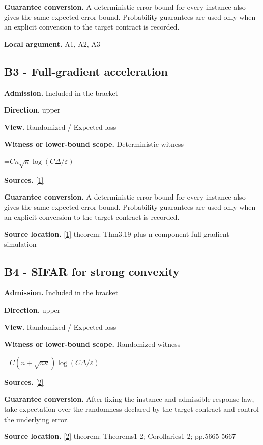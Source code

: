 \documentclass[10pt,a4paper]{article}
\newcommand{\AtlasMath}[1]{\par\begingroup\centering\setbox0=\hbox{$\displaystyle #1$}\ifdim\wd0>1.4\linewidth\typeout{ATLAS WIDE FORMULA: \the\wd0}\fi\ifdim\wd0>\linewidth\resizebox{\linewidth}{!}{\box0}\else\box0\fi\par\endgroup}
\begin{document}
\textbf{Guarantee conversion.} A deterministic error bound for every instance also gives the same expected-error bound. Probability guarantees are used only when an explicit conversion to the target contract is recorded.

\textbf{Local argument.} A1, A2, A3

\subsection{B3 - Full-gradient acceleration}
\textbf{Admission.} Included in the bracket

\textbf{Direction.} upper

\textbf{View.} Randomized / Expected loss

\textbf{Witness or lower-bound scope.} Deterministic witness

\AtlasMath{Cn\sqrt\kappa\log(C\Delta/\varepsilon)}
\textbf{Sources.} \href{https://arxiv.org/pdf/1405.4980}{[1]}

\textbf{Guarantee conversion.} A deterministic error bound for every instance also gives the same expected-error bound. Probability guarantees are used only when an explicit conversion to the target contract is recorded.

\textbf{Source location.} \href{https://arxiv.org/pdf/1405.4980}{[1]} theorem: Thm3.19 plus n component full-gradient simulation

\subsection{B4 - SIFAR for strong convexity}
\textbf{Admission.} Included in the bracket

\textbf{Direction.} upper

\textbf{View.} Randomized / Expected loss

\textbf{Witness or lower-bound scope.} Randomized witness

\AtlasMath{C(n+\sqrt{n\kappa})\log(C\Delta/\varepsilon)}
\textbf{Sources.} \href{https://www.ijcai.org/proceedings/2025/0630.pdf}{[2]}

\textbf{Guarantee conversion.} After fixing the instance and admissible response law, take expectation over the randomness declared by the target contract and control the underlying error.

\textbf{Source location.} \href{https://www.ijcai.org/proceedings/2025/0630.pdf}{[2]} theorem: Theorems1-2; Corollaries1-2; pp.5665-5667
\end{document}
